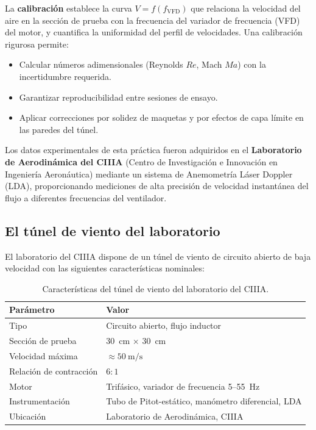 \documentclass[12pt,a4paper]{article}
\begin{document}
La \textbf{calibración} establece la curva $V = f(f_\mathrm{VFD})$ que
relaciona la velocidad del aire en la sección de prueba con la frecuencia del
variador de frecuencia (VFD) del motor, y cuantifica la uniformidad del perfil
de velocidades.  Una calibración rigurosa permite:
\begin{itemize}
	\item Calcular números adimensionales (Reynolds $Re$, Mach $Ma$) con la
	      incertidumbre requerida.
	\item Garantizar reproducibilidad entre sesiones de ensayo.
	\item Aplicar correcciones por solidez de maquetas y por efectos de capa
	      límite en las paredes del túnel.
\end{itemize}

Los datos experimentales de esta práctica fueron adquiridos en el
\textbf{Laboratorio de Aerodinámica del CIIIA} (Centro de Investigación e
Innovación en Ingeniería Aeronáutica) mediante un sistema de Anemometría Láser
Doppler (LDA), proporcionando mediciones de alta precisión de velocidad
instantánea del flujo a diferentes frecuencias del ventilador.

\subsection{El túnel de viento del laboratorio}

El laboratorio del CIIIA dispone de un túnel de viento de circuito abierto de
baja velocidad con las siguientes características nominales:

\begin{table}[H]
	\centering
	\caption{Características del túnel de viento del laboratorio del CIIIA.}
	\label{tab:tunel}
	\begin{tabular}{ll}
		\toprule
		\textbf{Parámetro}      & \textbf{Valor}                                     \\
		\midrule
		Tipo                    & Circuito abierto, flujo inductor                   \\
		Sección de prueba       & \SI{30}{\cm} $\times$ \SI{30}{\cm}                 \\
		Velocidad máxima        & $\approx\SI{50}{\metre\per\second}$                \\
		Relación de contracción & $6{:}1$                                            \\
		Motor                   & Trifásico, variador de frecuencia 5--55~Hz         \\
		Instrumentación         & Tubo de Pitot-estático, manómetro diferencial, LDA \\
		Ubicación               & Laboratorio de Aerodinámica, CIIIA                 \\
		\bottomrule
	\end{tabular}
\end{table}
\end{document}
